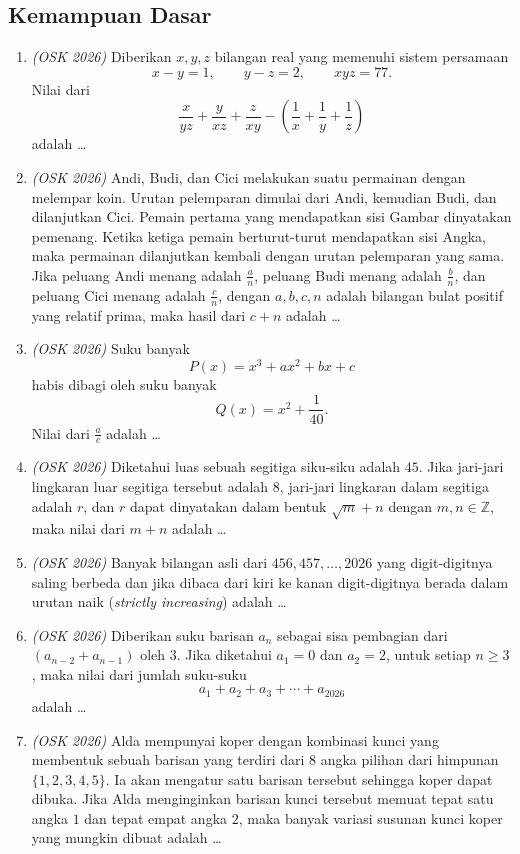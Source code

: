 \documentclass[11pt]{scrartcl}
\begin{document}
\subsection{Kemampuan Dasar}
\begin{enumerate}
\item \textit{(OSK 2026)} Diberikan $x,y,z$ bilangan real yang memenuhi sistem persamaan
\[
x-y=1,\qquad
y-z=2,\qquad
xyz=77.
\]
Nilai dari
\[
\frac{x}{yz}+\frac{y}{xz}+\frac{z}{xy}
-\left(\frac1x+\frac1y+\frac1z\right)
\]
adalah \ldots

\item \textit{(OSK 2026)} Andi, Budi, dan Cici melakukan suatu permainan dengan melempar koin. Urutan pelemparan dimulai dari Andi, kemudian Budi, dan dilanjutkan Cici. Pemain pertama yang mendapatkan sisi Gambar dinyatakan pemenang. Ketika ketiga pemain berturut-turut mendapatkan sisi Angka, maka permainan dilanjutkan kembali dengan urutan pelemparan yang sama. Jika peluang Andi menang adalah $\frac{a}{n}$, peluang Budi menang adalah $\frac{b}{n}$, dan peluang Cici menang adalah $\frac{c}{n}$, dengan $a,b,c,n$ adalah bilangan bulat positif yang relatif prima, maka hasil dari $c+n$ adalah \ldots

\item \textit{(OSK 2026)} Suku banyak
\[
P(x)=x^3+ax^2+bx+c
\]
habis dibagi oleh suku banyak
\[
Q(x)=x^2+\frac1{40}.
\]
Nilai dari $\frac{a}{c}$ adalah \ldots

\item \textit{(OSK 2026)} Diketahui luas sebuah segitiga siku-siku adalah $45$. Jika jari-jari lingkaran luar segitiga tersebut adalah $8$, jari-jari lingkaran dalam segitiga adalah $r$, dan $r$ dapat dinyatakan dalam bentuk $\sqrt{m}+n$ dengan $m,n\in\mathbb Z$, maka nilai dari $m+n$ adalah \ldots

\item \textit{(OSK 2026)} Banyak bilangan asli dari $456,457,\ldots,2026$ yang digit-digitnya saling berbeda dan jika dibaca dari kiri ke kanan digit-digitnya berada dalam urutan naik (\textit{strictly increasing}) adalah \ldots

\item \textit{(OSK 2026)} Diberikan suku barisan $a_n$ sebagai sisa pembagian dari $(a_{n-2}+a_{n-1})$ oleh $3$. Jika diketahui $a_1=0$ dan $a_2=2$, untuk setiap $n\ge3$, maka nilai dari jumlah suku-suku
\[
a_1+a_2+a_3+\cdots+a_{2026}
\]
adalah \ldots

\item \textit{(OSK 2026)} Alda mempunyai koper dengan kombinasi kunci yang membentuk sebuah barisan yang terdiri dari $8$ angka pilihan dari himpunan $\{1,2,3,4,5\}$. Ia akan mengatur satu barisan tersebut sehingga koper dapat dibuka. Jika Alda menginginkan barisan kunci tersebut memuat tepat satu angka $1$ dan tepat empat angka $2$, maka banyak variasi susunan kunci koper yang mungkin dibuat adalah \ldots


\end{enumerate}
\end{document}
